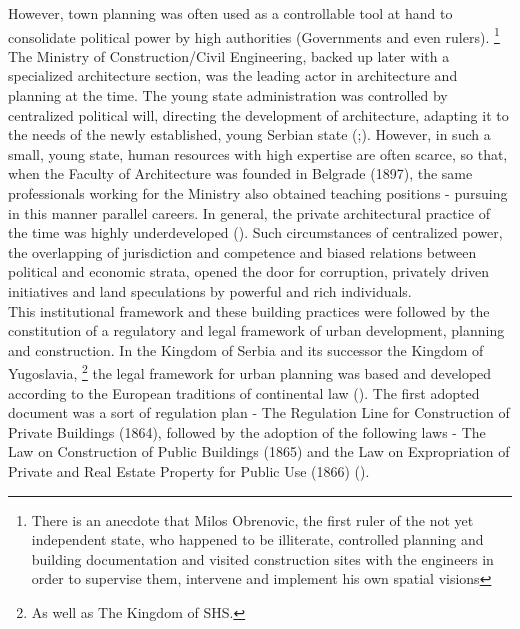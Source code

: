 \documentclass[11pt]{report}
\begin{document}
However, town planning was often used as a controllable tool at hand to consolidate political power by high authorities (Governments and even rulers). 
\footnote{There is an anecdote that Milos Obrenovic, the first ruler of the not yet independent state, who happened to be illiterate, controlled planning and building documentation and visited construction sites with the
engineers in order to supervise them, intervene and implement his own spatial visions}
The Ministry of Construction/Civil Engineering, backed up later with a specialized architecture section, was the leading actor in architecture and planning at the time. The young state administration was controlled by centralized political will, directing the development of architecture, adapting it to the needs of the newly established, young Serbian state (\href{Maksimovi}{\citealt{maksimovic_idejni_1978}};\href{ref}{\citealt{nedovicbudic_waves_2006}}).
However, in such a small, young state, human resources with high expertise are often  scarce,  so  that,  when  the  Faculty  of  Architecture  was  founded  in  Belgrade  (1897), the  same  professionals  working  for  the  Ministry  also  obtained  teaching  positions  - pursuing in this manner parallel careers. In general, the private architectural practice of the time was highly underdeveloped (\href{Mladjenovic}{\citealt{mladjenovic_novija_????}}). Such circumstances of centralized power, the overlapping of jurisdiction and competence and biased relations between political and economic strata, opened the door for corruption, privately driven initiatives and land speculations by powerful and rich individuals.
\\

This institutional framework and these building practices were followed by the constitution of a regulatory and legal framework of urban development, planning and construction. In the Kingdom of Serbia and its successor the Kingdom of Yugoslavia,
\footnote{As well as The Kingdom of SHS.}
the legal framework for urban planning was based and developed according to the European traditions of continental law (\href{Zekovic}{\citealt{zekovic_historical_2016}}).
The first adopted document was a sort of regulation plan - The Regulation Line for Construction of Private Buildings (1864), followed by the adoption of the following laws - The Law on Construction of Public Buildings (1865) and the Law on Expropriation of Private and Real Estate Property for Public Use (1866) (\href{Nedovic}{\citealt{nedovicbudic_waves_2006}}).
\\
\end{document}
